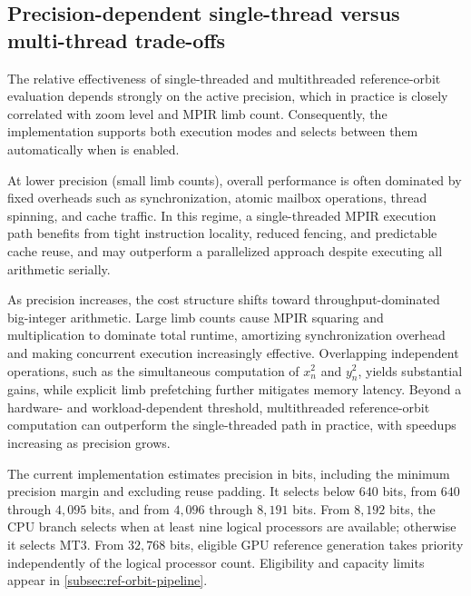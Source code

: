 \subsection{Precision-dependent single-thread versus multi-thread trade-offs}
\label{subsec:ref-orbit-mt-tradeoff}

The relative effectiveness of single-threaded and multithreaded reference-orbit
evaluation depends strongly on the active precision, which in practice is
closely correlated with zoom level and MPIR limb count.  Consequently, the
implementation supports both execution modes and selects between them
automatically when  is enabled.

At lower precision (small limb counts), overall performance is often dominated
by fixed overheads such as synchronization, atomic mailbox operations, thread
spinning, and cache traffic.  In this regime, a single-threaded MPIR execution
path benefits from tight instruction locality, reduced fencing, and predictable
cache reuse, and may outperform a parallelized approach despite executing all
arithmetic serially.

As precision increases, the cost structure shifts toward throughput-dominated
big-integer arithmetic.  Large limb counts cause MPIR squaring and multiplication
to dominate total runtime, amortizing synchronization overhead and making
concurrent execution increasingly effective.  Overlapping independent
operations, such as the simultaneous computation of \(x_n^2\) and \(y_n^2\),
yields substantial gains, while explicit limb prefetching further mitigates
memory latency.  Beyond a hardware- and workload-dependent threshold,
multithreaded reference-orbit computation can outperform the
single-threaded path in practice, with speedups increasing as precision grows.

The current  implementation estimates precision in bits, including
the minimum precision margin and excluding reuse padding. It selects
 below $640$ bits,  from $640$ through
$4{,}095$ bits, and  from $4{,}096$
through $8{,}191$ bits. From $8{,}192$ bits, the CPU branch selects
 when at least nine logical processors are
available; otherwise it selects MT3. From $32{,}768$ bits, eligible GPU reference
generation takes priority independently of the logical processor count.
Eligibility and capacity limits appear in \cref{subsec:ref-orbit-pipeline}.

